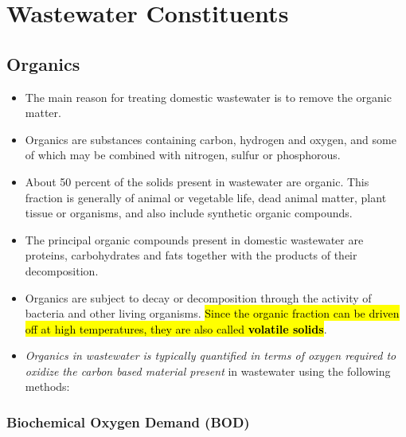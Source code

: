 \newpage
\section{Wastewater Constituents}
	\subsection{Organics}
		\begin{itemize}
			\item The main reason for treating domestic wastewater is to remove the organic matter.  
			\item Organics are substances containing carbon, hydrogen and oxygen, and some of which may be combined with nitrogen, sulfur or phosphorous.
			\item About 50 percent of the solids present in wastewater are organic.  This fraction is generally of animal or vegetable life, dead animal matter, plant tissue or organisms, and also include synthetic organic compounds.
			\item The principal organic compounds present in domestic wastewater are proteins, carbohydrates and fats together with the products of their decomposition.
			\item Organics are subject to decay or decomposition through the activity of bacteria and other living organisms.  \hl{Since the organic fraction can be driven off at high temperatures, they are also called \textbf{volatile solids}}.\
			\item \emph{Organics in wastewater is typically quantified in terms of oxygen required to oxidize the carbon based material present} in wastewater using the following methods:\\
		\end{itemize}
\subsubsection{Biochemical Oxygen Demand (BOD)}

